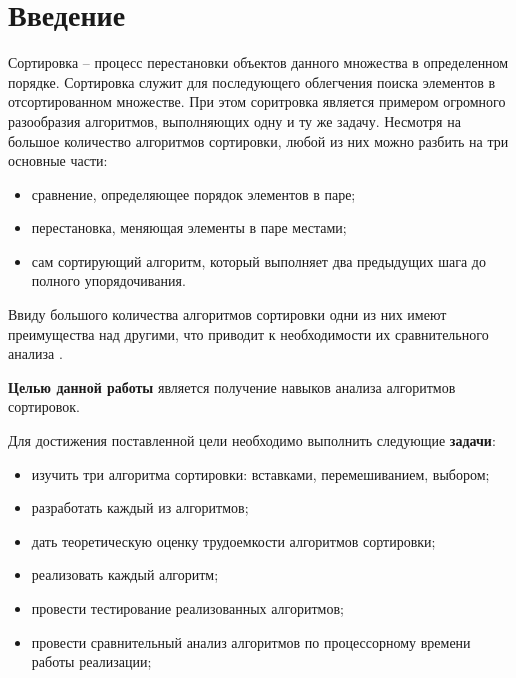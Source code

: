 \chapter*{Введение}

Сортировка -- процесс перестановки объектов данного множества в определенном
порядке. Сортировка служит для последующего облегчения поиска элементов в
отсортированном множестве. При этом соритровка является примером огромного
разообразия алгоритмов, выполняющих одну и ту же задачу. Несмотря на большое
количество алгоритмов сортировки, любой из них можно разбить на три основные
части:
\begin{itemize}[left=\parindent]
    \item сравнение, определяющее порядок элементов в паре;
    \item перестановка, меняющая элементы в паре местами;
    \item сам сортирующий алгоритм, который выполняет два предыдущих шага до
          полного упорядочивания.
\end{itemize}

Ввиду большого количества алгоритмов сортировки одни из них имеют преимущества
над другими, что приводит к необходимости их сравнительного анализа
\cite{intro}.

\textbf{Целью данной работы} является получение навыков анализа алгоритмов
сортировок.

Для достижения поставленной цели необходимо выполнить следующие
\textbf{задачи}:
\begin{itemize}[left=\parindent]
    \item изучить три алгоритма сортировки: вставками, перемешиванием, выбором;
    \item разработать каждый из алгоритмов;
    \item дать теоретическую оценку трудоемкости алгоритмов сортировки;
    \item реализовать каждый алгоритм;
    \item провести тестирование реализованных алгоритмов;
    \item провести сравнительный анализ алгоритмов по процессорному времени
          работы реализации;
\end{itemize}
